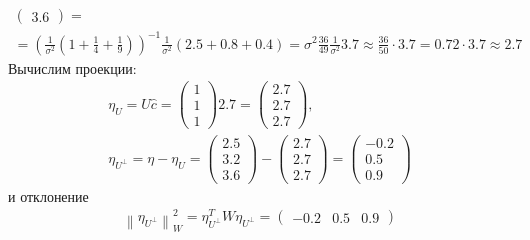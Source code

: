 \documentclass[a4paper,12pt]{article}
\newcommand{\norm}[1]{\left \| #1 \right \|}
\newcommand{\pro}[2]{#1_{#2^\perp}}
\begin{document}
\begin{enumerate}
\begin{multline*}
\begin{pmatrix}
                  3.6
              \end{pmatrix} = \\
              = \left( \frac{1}{\sigma^2} \left ( 1 + \frac{1}{4} + \frac{1}{9} \right) \right)^{-1} \frac{1}{\sigma^2} \left( 2.5 + 0.8 + 0.4 \right)
              = \sigma^2 \frac{36}{49} \frac{1}{\sigma^2} 3.7
              \approx \frac{36}{50} \cdot 3.7
              = 0.72 \cdot 3.7
              \approx 2.7
          \end{multline*}
          Вычислим проекции:
          \begin{gather*}
              \eta_U
              = U \widehat{c}
              = \begin{pmatrix}
                  1 \\
                  1 \\
                  1
              \end{pmatrix}
              2.7
              = \begin{pmatrix}
                  2.7 \\
                  2.7 \\
                  2.7
              \end{pmatrix} , \\
              \eta_{U^\perp}
              = \eta - \eta_U
              = \begin{pmatrix}
                  2.5 \\
                  3.2 \\
                  3.6
              \end{pmatrix}
              - \begin{pmatrix}
                  2.7 \\
                  2.7 \\
                  2.7
              \end{pmatrix}
              = \begin{pmatrix}
                  -0.2 \\
                  0.5  \\
                  0.9
              \end{pmatrix}
          \end{gather*}
          и отклонение
          \begin{multline*}
              \norm{\pro{\eta}{U}}_W^2
              = \pro{\eta}{U}^T W \pro{\eta}{U}
              = \begin{pmatrix}
                  -0.2 & 0.5 & 0.9

\end{pmatrix}
\end{multline*}
\end{enumerate}
\end{document}

